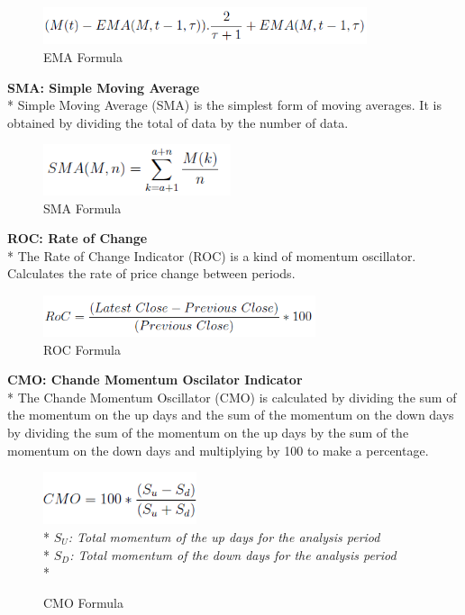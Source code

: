 \documentclass{article}
\begin{document}
\begin{figure}[H]
\begin{center}
   \includegraphics[width=95mm,scale=0.8]{assets/formulas/ema.png}
   \caption{EMA Formula}
\end{center}
\end{figure}
\noindent
\textbf{SMA: Simple Moving Average} \\*
Simple Moving Average (SMA) is the simplest form of moving averages. It is obtained by dividing the total of data by the number of data.
\begin{figure}[H]
\begin{center}
   \includegraphics[width=55mm,scale=0.8]{assets/formulas/sma.png}
   \caption{SMA Formula}
\end{center}
\end{figure}
\noindent
\textbf{ROC: Rate of Change}\\*
The Rate of Change Indicator (ROC) is a kind of momentum oscillator. Calculates the rate of price change between periods.
\begin{figure}[H]
\begin{center}
   \includegraphics[width=80mm,scale=0.8]{assets/formulas/roc.png}
   \caption{ROC Formula}
\end{center}
\end{figure}
\noindent
\textbf{CMO: Chande Momentum Oscilator Indicator} \\*
The Chande Momentum Oscillator (CMO) is calculated by dividing the sum of the momentum on the up days and the sum of the momentum on the down days by dividing the sum of the momentum on the up days by the sum of the momentum on the down days and multiplying by 100 to make a percentage.
\begin{figure}[H]
\begin{center}
   \includegraphics[width=45mm,scale=0.8]{assets/formulas/cmo.png}\\*
   \textit{$S_U$: Total momentum of the up days for the analysis period}\vspace{0.1cm}\\*
   \textit{$S_D$: Total momentum of the down days for the analysis period}\vspace{0.2cm}\\*
   \caption{CMO Formula}
\end{center}
\end{figure}
\end{document}
